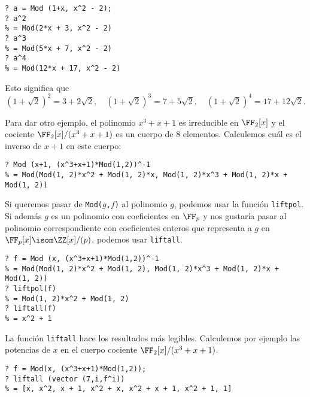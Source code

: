 \begin{framed}\footnotesize
\begin{verbatim}
? a = Mod (1+x, x^2 - 2);
? a^2
% = Mod(2*x + 3, x^2 - 2)
? a^3
% = Mod(5*x + 7, x^2 - 2)
? a^4
% = Mod(12*x + 17, x^2 - 2)
\end{verbatim}
\end{framed}

Esto significa que
\[ (1+\sqrt{2})^2 = 3 + 2\sqrt{2}, \quad
(1+\sqrt{2})^3 = 7 + 5\sqrt{2}, \quad
(1+\sqrt{2})^4 = 17 + 12\sqrt{2}. \]

Para dar otro ejemplo, el polinomio $x^3 + x + 1$ es irreducible en $\FF_2 [x]$
y el cociente $\FF_2 [x]/(x^3 + x + 1)$ es un cuerpo de $8$
elementos. Calculemos cuál es el inverso de $x+1$ en este cuerpo:

\begin{framed}\footnotesize
\begin{verbatim}
? Mod (x+1, (x^3+x+1)*Mod(1,2))^-1
% = Mod(Mod(1, 2)*x^2 + Mod(1, 2)*x, Mod(1, 2)*x^3 + Mod(1, 2)*x + Mod(1, 2))
\end{verbatim}
\end{framed}

Si queremos pasar de \texttt{Mod($g$,$f$)} al polinomio $g$, podemos usar
la función \texttt{liftpol}. Si además $g$ es un polinomio con coeficientes en
$\FF_p$ y nos gustaría pasar al polinomio correspondiente con coeficientes
enteros que representa a $g$ en $\FF_p [x] \isom \ZZ [x]/(p)$, podemos usar
\texttt{liftall}.

\begin{framed}\footnotesize
\begin{verbatim}
? f = Mod (x, (x^3+x+1)*Mod(1,2))^-1
% = Mod(Mod(1, 2)*x^2 + Mod(1, 2), Mod(1, 2)*x^3 + Mod(1, 2)*x + Mod(1, 2))
? liftpol(f)
% = Mod(1, 2)*x^2 + Mod(1, 2)
? liftall(f)
% = x^2 + 1
\end{verbatim}
\end{framed}

La función \texttt{liftall} hace los resultados más legibles. Calculemos por
ejemplo las potencias de $x$ en el cuerpo cociente $\FF_2 [x]/(x^3+x+1)$.

\begin{framed}\footnotesize
\begin{verbatim}
? f = Mod(x, (x^3+x+1)*Mod(1,2));
? liftall (vector (7,i,f^i))
% = [x, x^2, x + 1, x^2 + x, x^2 + x + 1, x^2 + 1, 1]
\end{verbatim}
\end{framed}

